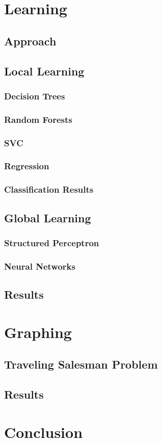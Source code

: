 \documentclass[12pt]{report}
\begin{document}
\chapter{Learning}

\section{Approach}

\section{Local Learning}
\subsection{Decision Trees}
\subsection{Random Forests}
\subsection{SVC}
\subsection{Regression}
\subsection{Classification Results}

\section{Global Learning}
\subsection{Structured Perceptron}
\subsection{Neural Networks}

\section{Results}

\chapter{Graphing}
\section{Traveling Salesman Problem}

\section{Results}

\chapter{Conclusion}



\end{document}
